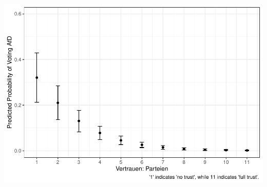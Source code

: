 \documentclass[
]{article}
\begin{document}
\includegraphics{AVCD_Final_Assignment-Edenhofer_latest_files/figure-latex/afd-trust-parties-1.pdf}
\end{document}
